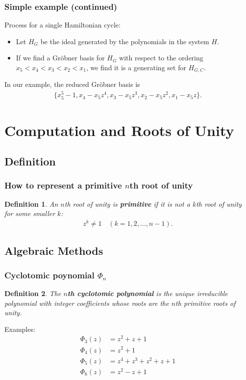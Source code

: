 \documentclass{beamer}
\newtheorem*{defin}{Definition}
\newcommand{\aln}[1]{\begin{align*} #1 \end{align*}} %
\begin{document}
\begin{frame}
\frametitle{Simple example (continued)}
Process for a single Hamiltonian cycle:
\begin{itemize}
\item Let $H_G$ be the ideal generated by the polynomials in the system $H$.
\item If we find a Gr\"obner basis for $H_G$ with respect to the ordering $x_5 < x_4 < x_3 < x_2 < x_1$, we find it is a generating set for $H_{G,C}$.
\end{itemize}
In our example, the reduced Gr\"obner basis is
\begin{align*}
  \{x_5^5 - 1, x_4 - x_5 z^4, x_3 - x_5 z^3, x_2 - x_5 z^2, x_1 - x_5 z\}.
\end{align*}
\end{frame}

\section{Computation and Roots of Unity}

\subsection{Definition}

\begin{frame}
\frametitle{How to represent a primitive $n$th root of unity}
\begin{defin}
  An $n$th root of unity is \textbf{primitive} if it is not a $k$th root of unity for some smaller $k$:
  \aln{
    z^k \neq 1 \quad (k = 1, 2, \ldots, n-1).
  }
\end{defin}
\end{frame}

\subsection{Algebraic Methods}

\begin{frame}
\frametitle{Cyclotomic poynomial $\Phi_n$}
\begin{defin}
  The \textbf{$n$th cyclotomic polynomial} is the unique irreducible polynomial with integer coefficients whose roots are the $n$th primitive roots of unity.
\end{defin}
Examples:
\aln{
  \Phi_3(z) &= z^2 + z + 1\\
  \Phi_4(z) &= z^2 + 1\\
  \Phi_5(z) &= z^4 + z^3 + z^2 + z + 1\\
  \Phi_6(z) &= z^2 - z + 1
}
\end{frame}
\end{document}
